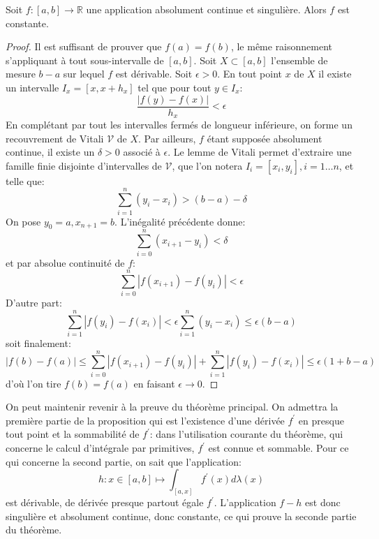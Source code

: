 \begin{lemme}
Soit $f \colon [a,b] \to \mathbb{R}$ une application absolument continue et
singulière. Alors $f$ est constante.
\end{lemme}
\begin{proof}
Il est suffisant de prouver que $f(a)=f(b)$, le même raisonnement s'appliquant à
tout sous-intervalle de $[a,b]$.
Soit $X \subset [a,b]$ l'ensemble de mesure $b-a$ sur lequel $f$ est dérivable.
Soit $\epsilon > 0$. En tout point $x$ de $X$ il existe un intervalle $I_x =
[x, x+h_x]$ tel que pour tout $y \in I_x$:
\[
\frac{|f(y)-f(x)|}{h_x} < \epsilon
\] 
En complétant par tout les intervalles fermés de longueur inférieure, on forme
un recouvrement de Vitali $\mathcal{V}$ de $X$. 
Par ailleurs, $f$ étant supposée absolument continue, il existe un $\delta > 0$
associé à $\epsilon$. Le lemme de Vitali permet d'extraire une famille finie
disjointe d'intervalles de $\mathcal{V}$, que l'on notera $I_i = [x_i,
y_i], i=1\dots n$, et telle que:
\[
\sum_{i=1}^n (y_i - x_i) > (b-a) - \delta
\]
On pose $y_0 = a, x_{n+1}=b$. L'inégalité précédente donne:
\[
\sum_{i=0}^n (x_{i+1}-y_i) < \delta
\]
et par absolue continuité de $f$:
\[
\sum_{i=0}^n |f(x_{i+1}) - f(y_i)| < \epsilon
\]
D'autre part:
\[
\sum_{i=1}^n |f(y_i)-f(x_i)| < \epsilon \sum_{i=1}^n (y_i-x_i) \leq \epsilon
(b-a)
\]
soit finalement:
\[
|f(b)-f(a)| \leq \sum_{i=0}^n |f(x_{i+1}) - f(y_i)| + \sum_{i=1}^n
|f(y_i)-f(x_i)| \leq \epsilon (1 + b - a)
\]
d'où l'on tire $f(b)=f(a)$ en faisant $\epsilon \to 0$.
\end{proof}
On peut maintenir revenir à la preuve du théorème principal. On admettra la
première partie de la proposition qui est l'existence d'une dérivée $f^\prime$
en presque tout point et la sommabilité de $f^\prime$: dans l'utilisation
courante du théorème, qui concerne le calcul d'intégrale par primitives,
$f^\prime$ est connue et sommable. 
Pour ce qui concerne la second partie, on sait que l'application:
\[
h \colon x \in [a,b] \mapsto \int_{[a,x]} f^\prime(x) d \lambda(x)
\]
est dérivable, de dérivée presque partout égale $f^\prime$. L'application $f-h$ est donc singulière et
absolument continue, donc constante, ce qui prouve la seconde partie du théorème.
